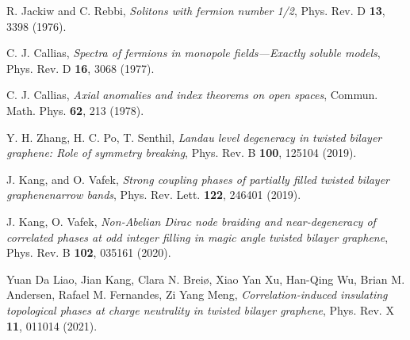 \documentclass[aps,prb,amsmath,amssymb,floatfix,twocolumn]{revtex4}
\begin{document}
\begin{thebibliography}{}
 R. Jackiw and C. Rebbi, \emph{Solitons with fermion number 1/2}, Phys. Rev. D \textbf{13}, 3398 (1976).

 C. J. Callias, \emph{Spectra of fermions in monopole fields—Exactly soluble models}, Phys. Rev. D \textbf{16}, 3068 (1977).

 C. J. Callias, \emph{Axial anomalies and index theorems on open spaces}, Commun. Math. Phys. \textbf{62}, 213 (1978).

 Y. H. Zhang, H. C. Po, T. Senthil, \emph{Landau level degeneracy in twisted bilayer graphene: Role of symmetry breaking}, Phys. Rev. B \textbf{100}, 125104 (2019).

 J. Kang, and O. Vafek, \emph{Strong coupling phases of partially filled twisted bilayer graphenenarrow bands}, Phys. Rev. Lett. \textbf{122}, 246401 (2019).

 J. Kang, O. Vafek, \emph{Non-Abelian Dirac node braiding and near-degeneracy of correlated phases at odd integer filling in magic angle twisted bilayer graphene}, Phys. Rev. B \textbf{102}, 035161 (2020).

 Yuan Da Liao, Jian Kang, Clara N. Breiø, Xiao Yan Xu, Han-Qing Wu, Brian M. Andersen, Rafael M. Fernandes, Zi Yang Meng, \emph{Correlation-induced insulating topological phases at charge neutrality in twisted bilayer graphene}, Phys. Rev. X \textbf{11}, 011014 (2021).
 
\end{thebibliography}
\end{document}
